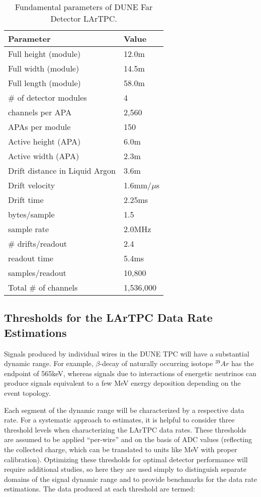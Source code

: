 \begin{table}[ht!]
	\centering
	\begin{tabular}{| p{2.5in} | p{1in} |}
		\hline
		\textbf{Parameter} & \textbf{Value} \\ \hline
		Full height (module) & 12.0m \\ \hline
		Full width (module) & 14.5m \\ \hline
		Full length (module) & 58.0m \\ \hline
		\# of detector modules & 4 \\ \hline
		\hline
		channels per APA & 2,560 \\ \hline
		APAs per module & 150 \\ \hline
		Active height (APA) & 6.0m \\ \hline
		Active width (APA) & 2.3m \\ \hline  \hline
		Drift distance in Liquid Argon & 3.6m \\
		\hline
		Drift velocity & 1.6mm/$\mu$s \\ \hline
		Drift time & 2.25ms \\ \hline
		\hline
		bytes/sample & 1.5 \\ \hline
		sample rate & 2.0MHz \\ \hline
		\# drifts/readout & 2.4 \\ \hline
		\hline
		readout time & 5.4ms \\ \hline
		samples/readout & 10,800 \\
		\hline \hline
		Total \# of channels & 1,536,000 \\
		\hline
	\end{tabular}
	\caption{Fundamental parameters of DUNE Far Detector LArTPC.}
	\label{tab:fundamental-parameters}
\end{table}

\subsection{Thresholds for the LArTPC Data Rate Estimations}

Signals produced by individual wires in the DUNE TPC will have a substantial
dynamic range. For example, $\beta$-decay of naturally occurring isotope $^{39}Ar$ has the endpoint of
565keV, whereas signals due to interactions of energetic neutrinos can produce signals
equivalent to a few MeV energy deposition depending on the event topology.

Each segment of the dynamic range will be characterized by a respective data rate. 
For a systematic approach to estimates, it is helpful to consider
three threshold levels when characterizing the LArTPC data rates. These
thresholds are assumed to be applied ``per-wire'' and on the basis of ADC values (reflecting the collected charge, which can be translated to units like MeV with proper calibration). Optimizing these thresholds
for optimal detector performance will require additional studies, so here they are used simply
to distinguish separate domains of the signal dynamic range and to provide benchmarks for the data
rate estimations. The data produced at each threshold are termed:

